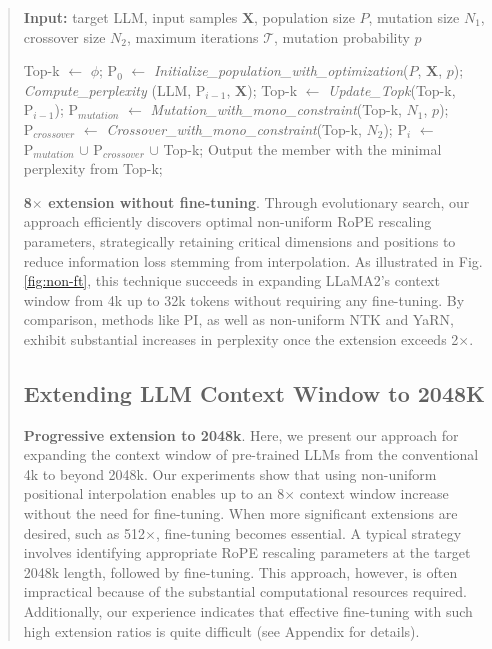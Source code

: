 \begin{abstract}
\begin{algorithm}[t]
	\small
	\caption{The search algorithm}
	\textbf{Input:} target LLM, input samples $\mathbf{X}$, population size $P$, mutation size $N_1$, crossover size $N_2$, maximum iterations $\mathcal{T}$, mutation probability $p$\\

	\begin{algorithmic}[1]
		\label{alg:search}
		\STATE Top-k $\leftarrow$ $\phi$;	
		\STATE $\text{P}_0$ $\leftarrow$ \textit{Initialize\_population\_with\_optimization}($P$, $\mathbf{X}$, $p$); 
		\STATE \textit{Compute\_perplexity} (LLM, $\text{P}_{i-1}$, $\mathbf{X}$);
		\STATE Top-k $\leftarrow$ \textit{Update\_Topk}(Top-k, $\text{P}_{i-1}$);
		\STATE $\text{P}_{mutation}$ $\leftarrow$ \textit{Mutation\_with\_mono\_constraint}(Top-k, $N_1$, $p$); 
		\STATE $\text{P}_{crossover}$ $\leftarrow$ \textit{Crossover\_with\_mono\_constraint}(Top-k, $N_2$);
		\STATE $\text{P}_i$ $\leftarrow$ $\text{P}_{mutation}$ $\cup$ $\text{P}_{crossover}$ $\cup$ Top-k;
		\ENDFOR
		\STATE Output the member with the minimal perplexity from Top-k;
	\end{algorithmic}
\end{algorithm}

\textbf{8$\times$ extension without fine-tuning}. Through evolutionary search, our approach efficiently discovers optimal non-uniform RoPE rescaling parameters, strategically retaining critical dimensions and positions to reduce information loss stemming from interpolation. As illustrated in Fig.\ref{fig:non-ft}, this technique succeeds in expanding LLaMA2’s context window from 4k up to 32k tokens without requiring any fine-tuning. By comparison, methods like PI, as well as non-uniform NTK and YaRN, exhibit substantial increases in perplexity once the extension exceeds 2$\times$.

\subsection{Extending LLM Context Window to 2048K}
\label{sec:extendto2048k}

\textbf{Progressive extension to 2048k}. Here, we present our approach for expanding the context window of pre-trained LLMs from the conventional 4k to beyond 2048k. Our experiments show that using non-uniform positional interpolation enables up to an 8$\times$ context window increase without the need for fine-tuning. When more significant extensions are desired, such as 512$\times$, fine-tuning becomes essential. A typical strategy involves identifying appropriate RoPE rescaling parameters at the target 2048k length, followed by fine-tuning. This approach, however, is often impractical because of the substantial computational resources required. Additionally, our experience indicates that effective fine-tuning with such high extension ratios is quite difficult (see Appendix for details).


\end{abstract}
